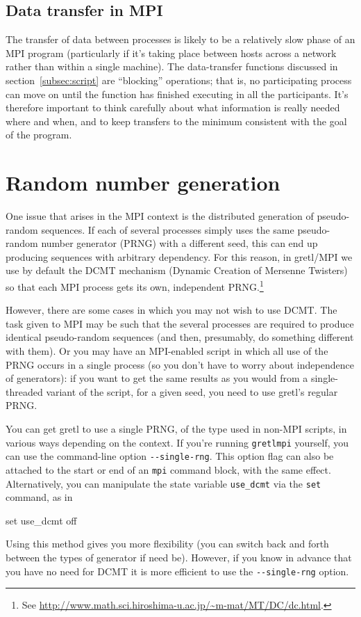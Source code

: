 \documentclass{article}
\begin{document}
\subsection{Data transfer in MPI}
\label{sec:data-transfer}

The transfer of data between processes is likely to be a relatively slow
phase of an MPI program (particularly if it's taking place between
hosts across a network rather than within a single machine). The
data-transfer functions discussed in section~\ref{subsec:script} are
``blocking'' operations; that is, no participating process can move on
until the function has finished executing in all the participants.
It's therefore important to think carefully about what information is
really needed where and when, and to keep transfers to the minimum
consistent with the goal of the program.


\section{Random number generation}
\label{sec:random}

One issue that arises in the MPI context is the distributed generation
of pseudo-random sequences. If each of several processes simply uses
the same pseudo-random number generator (PRNG) with a different seed,
this can end up producing sequences with arbitrary dependency. For
this reason, in gretl/MPI we use by default the \textsf{DCMT}
mechanism (Dynamic Creation of Mersenne Twisters) so that each MPI
process gets its own, independent PRNG.\footnote{See
  \url{http://www.math.sci.hiroshima-u.ac.jp/~m-mat/MT/DC/dc.html}.}

However, there are some cases in which you may not wish to use
\textsf{DCMT}. The task given to MPI may be such that the several
processes are required to produce identical pseudo-random sequences
(and then, presumably, do something different with them). Or you may
have an MPI-enabled script in which all use of the PRNG occurs in a
single process (so you don't have to worry about independence of
generators): if you want to get the same results as you would from a
single-threaded variant of the script, for a given seed, you need to
use gretl's regular PRNG.

You can get gretl to use a single PRNG, of the type used in non-MPI
scripts, in various ways depending on the context. If you're running
\texttt{gretlmpi} yourself, you can use the command-line option
\verb|--single-rng|. This option flag can also be attached to the
start or end of an \texttt{mpi} command block, with the same effect.
Alternatively, you can manipulate the state variable \verb|use_dcmt|
via the \texttt{set} command, as in
\begin{code}
set use_dcmt off
\end{code}
Using this method gives you more flexibility (you can switch back and
forth between the types of generator if need be). However, if you know
in advance that you have no need for \textsf{DCMT} it is more
efficient to use the \verb|--single-rng| option.
\end{document}
